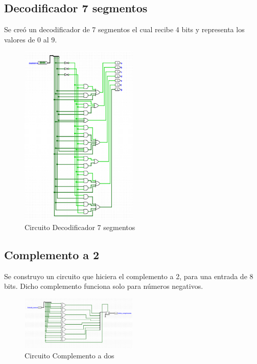 \documentclass{article}
\begin{document}
\subsection{Decodificador 7 segmentos}
Se creó un decodificador de 7 segmentos el cual recibe 4 bits y representa los valores de 0 al 9.
\begin{figure}[h] %
    \centering
    \includegraphics[width=0.5\textwidth]{imagenes/circuito_deco.png} %
    \caption{Circuito Decodificador 7 segmentos} %
    \label{fig:deco7seg} %
\end{figure}
\newpage

\subsection{Complemento a 2}
Se construyo un circuito que hiciera el complemento a 2, para una entrada de 8 bits. Dicho complemento 
funciona solo para números negativos.
\begin{figure}[h] %
    \centering
    \includegraphics[width=0.5\textwidth]{imagenes/complemento_2.png} %
    \caption{Circuito Complemento a dos} %
    \label{fig:complemento} %
\end{figure}
\end{document}
